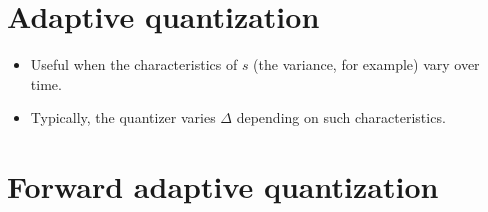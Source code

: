 
\section{Adaptive quantization}
\begin{itemize}
\item
  Useful when the characteristics of \(s\) (the variance, for example)
  vary over time.
\item
  Typically, the quantizer varies \(\Delta\) depending on such
  characteristics.
\end{itemize}

\section{Forward adaptive quantization}
